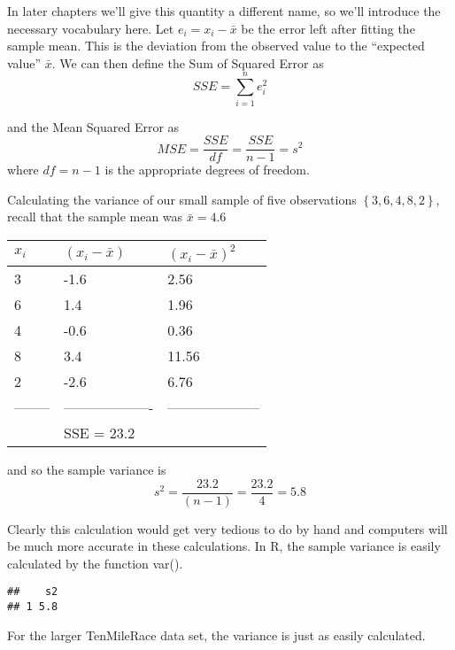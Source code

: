 \documentclass[]{book}
\newenvironment{Shaded}{\begin{snugshade}}{\end{snugshade}}
\newcommand{\KeywordTok}[1]{\textcolor[rgb]{0.13,0.29,0.53}{\textbf{{#1}}}}
\newcommand{\DataTypeTok}[1]{\textcolor[rgb]{0.13,0.29,0.53}{{#1}}}
\newcommand{\DecValTok}[1]{\textcolor[rgb]{0.00,0.00,0.81}{{#1}}}
\newcommand{\StringTok}[1]{\textcolor[rgb]{0.31,0.60,0.02}{{#1}}}
\newcommand{\CommentTok}[1]{\textcolor[rgb]{0.56,0.35,0.01}{\textit{{#1}}}}
\newcommand{\NormalTok}[1]{{#1}}
\begin{document}
In later chapters we'll give this quantity a different name, so we'll
introduce the necessary vocabulary here. Let \(e_{i}=x_{i}-\bar{x}\) be
the error left after fitting the sample mean. This is the deviation from
the observed value to the ``expected value'' \(\bar{x}\). We can then
define the Sum of Squared Error as \[SSE=\sum_{i=1}^{n}e_{i}^{2}\]

and the Mean Squared Error as
\[MSE=\frac{SSE}{df}=\frac{SSE}{n-1}=s^{2}\] where \(df=n-1\) is the
appropriate degrees of freedom.

Calculating the variance of our small sample of five observations
\(\left\{ 3,6,4,8,2\right\}\), recall that the sample mean was
\(\bar{x}=4.6\)

\begin{longtable}[]{@{}lll@{}}
\toprule
\(x_i\) & \((x_i-\bar{x})\) & \((x_i-\bar{x})^2\)\tabularnewline
\midrule
\endhead
3 & -1.6 & 2.56\tabularnewline
6 & 1.4 & 1.96\tabularnewline
4 & -0.6 & 0.36\tabularnewline
8 & 3.4 & 11.56\tabularnewline
2 & -2.6 & 6.76\tabularnewline
-------- & ------------------- & --------------------\tabularnewline
& SSE = 23.2\tabularnewline
\bottomrule
\end{longtable}

and so the sample variance is
\[s^2 = \frac{23.2}{(n-1)} = \frac{23.2}{4}=5.8\]

Clearly this calculation would get very tedious to do by hand and
computers will be much more accurate in these calculations. In R, the
sample variance is easily calculated by the function var().

\begin{Shaded}
\end{Shaded}

\begin{verbatim}
##    s2
## 1 5.8
\end{verbatim}

For the larger TenMileRace data set, the variance is just as easily
calculated.
\end{document}
